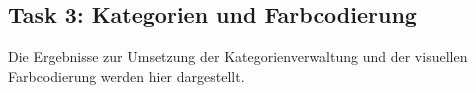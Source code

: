 \subsection{Task 3: Kategorien und Farbcodierung}
\label{subsec:results_t3}

Die Ergebnisse zur Umsetzung der Kategorienverwaltung und der visuellen Farbcodierung werden hier dargestellt.

%
